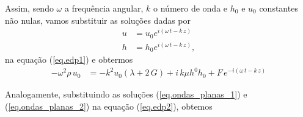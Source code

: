 Assim, sendo $\omega$ a frequ\^encia angular, $k$ o n\'umero de onda e $h_0$ e $u_0$ constantes n\~ao nulas, vamos substituir as solu\c{c}\~oes dadas por 
\begin{align}\label{eq.ondas_planas_1}
u&=u_0e^{i(\omega\,t-k\,z)}\\\label{eq.ondas_planas_2}
h&=h_0e^{i(\omega\,t-k\,z)},
\end{align}
na equa\c{c}\~ao (\ref{eq.edp1}) e obtermos
\begin{align}%
\label{eq.dedu_1}
-\omega^2\rho\,u_0&=-k^2u_0(\lambda+2\,G)+i\,k\mu h^0h_0+F\,e^{-i(\omega\,t-k\,z)}
\end{align}

Analogamente, substituindo as solu\c{c}\~oes (\ref{eq.ondas_planas_1}) e (\ref{eq.ondas_planas_2}) na equa\c{c}\~ao (\ref{eq.edp2}), obtemos

